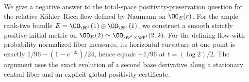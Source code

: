 
We give a negative answer to the total-space positivity-preservation question
for the relative K\"ahler--Ricci flow defined by Naumann on $\OO_E(r)$.
For the ample rank-two bundle $E=\OO_{\PP^1}(1)\oplus\OO_{\PP^1}(1)$,
we construct a smooth strictly positive initial metric on
$\OO_E(2)\simeq\OO_{\PP^1\times\PP^1}(2,2)$.
For the defining flow with probability-normalized fiber measures, its horizontal
curvature at one point is exactly
$1/96-(1-e^{-2t})/24$, hence equals $-1/96$ at $t=(\log2)/2$.
The argument uses the exact evolution of a second base derivative along a
stationary central fiber and an explicit global positivity certificate.
